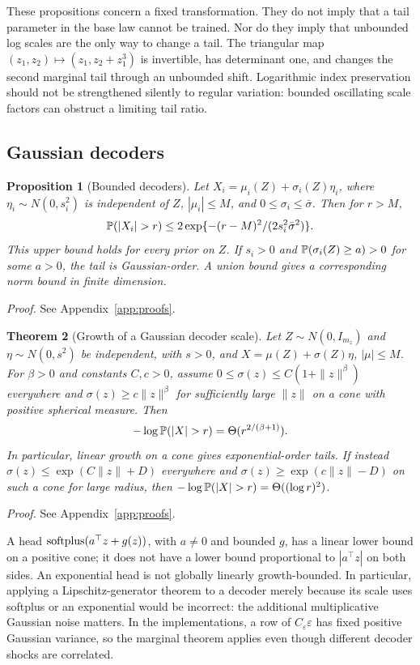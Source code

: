 \documentclass[11pt]{article}
\newtheorem{theorem}{Theorem}[section]
\newtheorem{proposition}[theorem]{Proposition}
\theoremstyle{definition}\newtheorem{definition}[theorem]{Definition}
\theoremstyle{remark}\newtheorem{remark}[theorem]{Remark}
\begin{document}
These propositions concern a fixed transformation. They do not imply that a tail parameter in the base law cannot be trained. Nor do they imply that unbounded log scales are the only way to change a tail. The triangular map $(z_1,z_2)\mapsto(z_1,z_2+z_1^3)$ is invertible, has determinant one, and changes the second marginal tail through an unbounded shift. Logarithmic index preservation should not be strengthened silently to regular variation: bounded oscillating scale factors can obstruct a limiting tail ratio.

\subsection{Gaussian decoders}
\begin{proposition}[Bounded decoders]\label{prop:bounded-vae}
Let $X_i=\mu_i(Z)+\sigma_i(Z)\eta_i$, where $\eta_i\sim N(0,s_i^2)$ is independent of $Z$, $|\mu_i|\le M$, and $0\le\sigma_i\le\bar\sigma$. Then for $r>M$,
\begin{equation}
\Prob(|X_i|>r)\le2\exp\{-(r-M)^2/(2s_i^2\bar\sigma^2)\}.
\end{equation}
This upper bound holds for every prior on $Z$. If $s_i>0$ and $\mathbb P(\sigma_i(Z)\ge a)>0$ for some $a>0$, the tail is Gaussian-order. A union bound gives a corresponding norm bound in finite dimension.
\end{proposition}
\noindent\emph{Proof.} See Appendix~\ref{app:proofs}.

\begin{theorem}[Growth of a Gaussian decoder scale]\label{thm:scale}
Let $Z\sim N(0,I_{m_z})$ and $\eta\sim N(0,s^2)$ be independent, with $s>0$, and $X=\mu(Z)+\sigma(Z)\eta$, $|\mu|\le M$. For $\beta>0$ and constants $C,c>0$, assume $0\le\sigma(z)\le C(1+\|z\|^\beta)$ everywhere and $\sigma(z)\ge c\|z\|^\beta$ for sufficiently large $\|z\|$ on a cone with positive spherical measure. Then
\begin{equation}\label{eq:scale-exponent}
-\log\Prob(|X|>r)=\Theta(r^{2/(\beta+1)}).
\end{equation}
In particular, linear growth on a cone gives exponential-order tails. If instead $\sigma(z)\le\exp(C\|z\|+D)$ everywhere and $\sigma(z)\ge\exp(c\|z\|-D)$ on such a cone for large radius, then $-\log\Prob(|X|>r)=\Theta((\log r)^2)$.
\end{theorem}
\noindent\emph{Proof.} See Appendix~\ref{app:proofs}.

A head $\operatorname{softplus}(a^\top z+g(z))$, with $a\ne0$ and bounded $g$, has a linear lower bound on a positive cone; it does not have a lower bound proportional to $|a^\top z|$ on both sides. An exponential head is not globally linearly growth-bounded. In particular, applying a Lipschitz-generator theorem to a decoder merely because its scale uses softplus or an exponential would be incorrect: the additional multiplicative Gaussian noise matters. In the implementations, a row of $C_\varepsilon\varepsilon$ has fixed positive Gaussian variance, so the marginal theorem applies even though different decoder shocks are correlated.
\end{document}
